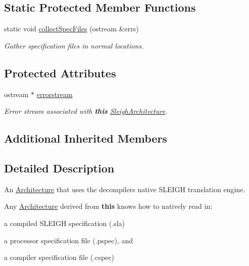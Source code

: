 \subsection*{Static Protected Member Functions}
\begin{DoxyCompactItemize}
\item 
static void \mbox{\hyperlink{class_sleigh_architecture_ac037ef568059275e73b9be91f0612ef3}{collect\+Spec\+Files}} (ostream \&errs)
\begin{DoxyCompactList}\small\item\em Gather specification files in normal locations. \end{DoxyCompactList}\end{DoxyCompactItemize}
\subsection*{Protected Attributes}
\begin{DoxyCompactItemize}
\item 
ostream $\ast$ \mbox{\hyperlink{class_sleigh_architecture_a338fd8b6671bc55ba6d6d4e8307957e9}{errorstream}}
\begin{DoxyCompactList}\small\item\em Error stream associated with {\bfseries{this}} \mbox{\hyperlink{class_sleigh_architecture}{Sleigh\+Architecture}}. \end{DoxyCompactList}\end{DoxyCompactItemize}
\subsection*{Additional Inherited Members}


\subsection{Detailed Description}
An \mbox{\hyperlink{class_architecture}{Architecture}} that uses the decompiler\textquotesingle{}s native S\+L\+E\+I\+GH translation engine. 

Any \mbox{\hyperlink{class_architecture}{Architecture}} derived from {\bfseries{this}} knows how to natively read in\+:
\begin{DoxyItemize}
\item a compiled S\+L\+E\+I\+GH specification (.sla)
\item a processor specification file (.pspec), and
\item a compiler specification file (.cspec)
\end{DoxyItemize}

